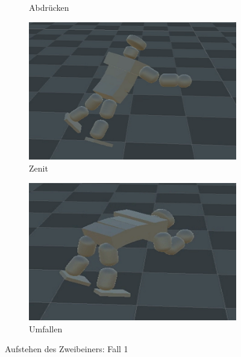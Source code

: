 \begin{figure}
\begin{subfigure}[b]{0.2\textwidth}
		\caption{Abdrücken}
	\end{subfigure}
	\hfill
	\begin{subfigure}[b]{0.2\textwidth}
		\centering
		\includegraphics[width=\textwidth]{resources/img/2BAufstehen/Fall1_zenit}
		\caption{Zenit}
	\end{subfigure}
	\hfill
	\begin{subfigure}[b]{0.2\textwidth}
		\centering
		\includegraphics[width=\textwidth]{resources/img/2BAufstehen/Fall1_fallen}
		\caption{Umfallen}
	\end{subfigure}
	\caption{Aufstehen des Zweibeiners: Fall 1}
	\label{fig:2BAufstehen1}
\end{figure}
